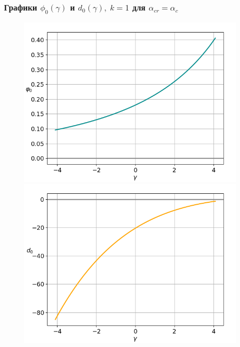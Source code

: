 \documentclass[fullscreen=true, unicode, bookmarks=false]{beamer}
\begin{document}
\begin{frame}
\frametitle{ Графики $ \phi_0(\gamma) $ и $ d_0(\gamma), \; k = 1 $ для $ \alpha_{cr}=\alpha_c $ }

\begin{figure} 
\begin{minipage}[h]{0.49\linewidth}
\begin{center}
\includegraphics[scale=0.37]{oscillating_phi0_000.png}
\end{center}
\end{minipage} 
\hfill
\begin{minipage}[h]{0.49\linewidth}
\begin{center}
\includegraphics[scale=0.37]{oscillating_d0_000.png} 
\end{center}
\end{minipage} 
\end{figure}

\end{frame}
\end{document}
